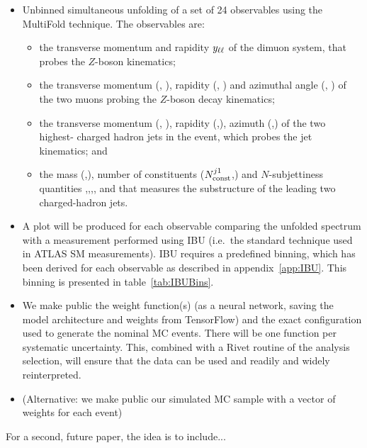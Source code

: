 \begin{itemize}
\item
  Unbinned simultaneous unfolding of a set of 24 observables using the MultiFold technique.
  The observables are:
  \begin{itemize}
    \item
      the transverse momentum \ptll{} and rapidity $y_{\ell\ell}$ of the dimuon system, that probes the $Z$-boson kinematics;
    \item
      the transverse momentum (\ptlm, \ptsm), rapidity (\ylm, \ysm) and azimuthal angle (\philm, \phism) of the two muons probing the $Z$-boson decay kinematics;
    \item
      the transverse momentum (\ptlj, \ptsj), rapidity (\ylj,\ysj), azimuth (\philj,\phisj) of the two highest-\pt{} charged hadron jets in the event, which probes the jet kinematics; and
    \item
      the mass (\mlj,\msj), number of constituents ($N^{j1}_\mathrm{const}$,\Ncsj) and $N$-subjettiness quantities ,,,, and  that measures the substructure of the leading two charged-hadron jets. 
  \end{itemize}  
\item
   A plot will be produced for each observable comparing the unfolded spectrum with a measurement performed using IBU (i.e.\ the standard technique used in ATLAS SM measurements).
   IBU requires a predefined binning, which has been derived for each observable as described in appendix~\ref{app:IBU}. This binning is presented in table~\ref{tab:IBUBins}.
\item
  We make public the weight function(s) (as a neural network, saving the model architecture and weights from TensorFlow) and the exact configuration used to generate the nominal MC events.  There will be one function per systematic uncertainty.  This, combined with a Rivet routine of the analysis selection, will ensure that the data can be used and readily and widely reinterpreted.
\item (Alternative: we make public our simulated MC sample with a vector of weights for each event)
\end{itemize}


For a second, future paper, the idea is to include...
